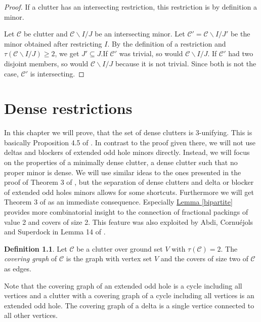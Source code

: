 \documentclass[a4paper, 12pt, twoside=false]{scrbook}
\theoremstyle{definition}
\newtheorem*{definition}{Definition}
\begin{document}
  \begin{proof}
      If a clutter has an intersecting restriction, this restriction is by definition a minor.

      Let $\mathcal{C}$ be clutter and $\mathcal{C} \backslash I /J$ be an intersecting minor.
      Let $\mathcal{C'}=\mathcal{C} \backslash I /J'$ be the minor obtained after restricting $I$.
      By the definition of a restriction and $\tau(\mathcal{C} \backslash I /J) \geq 2$, we get $J' \subseteq J$.If $\mathcal{C'}$ was trivial, so would $\mathcal{C} \backslash I / J$.
      If $\mathcal{C'}$ had two disjoint members, so would $\mathcal{C} \backslash I /J$ because it is not trivial.
      Since both is not the case, $\mathcal{C'}$ is intersecting.
  \end{proof}


   \chapter{Dense restrictions}
   In this chapter we will prove, that the set of dense clutters is 3-unifying.
   This is basically Proposition 4.5 of \cite{restrictions}.
   In contrast to the proof given there, we will not use deltas and blockers of extended odd hole minors directly.
   Instead, we will focus on the properties of a minimally dense clutter, a dense clutter such that no proper minor is dense.
   We will use similar ideas to the ones presented in the proof of Theorem 3 of \cite{deltas}, but the separation of dense clutters and delta or blocker of extended odd holes minors allows for some shortcuts.
   Furthermore we will get Theorem 3 of \cite{deltas} as an immediate consequence.
   Especially \hyperref[bipartite]{Lemma \ref*{bipartite}} provides more combinatorial insight to the connection of fractional packings of value 2 and covers of size 2.
   This feature was also exploited by Abdi, Cornuéjols and Superdock in Lemma 14 of \cite{lemma}.

   \begin{definition}
       Let $\mathcal{C}$ be a clutter over ground set $V$ with $\tau(\mathcal{C})=2$.
       The \emph{covering graph} of $\mathcal{C}$ is the graph with vertex set $V$ and the covers of size two of $\mathcal{C}$ as edges.
   \end{definition}
   Note that the covering graph of an extended odd hole is a cycle including all vertices and a clutter with a covering graph of a cycle including all vertices is an extended odd hole.
   The covering graph of a delta is a single vertice connected to all other vertices.
\end{document}
